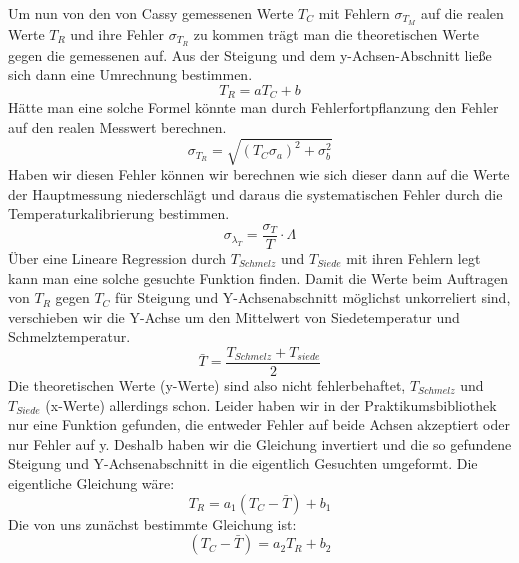 \documentclass[12pt,a4paper]{article}
\begin{document}
Um nun von den von Cassy gemessenen Werte $T_C$ mit Fehlern $\sigma_{T_M}$ auf die realen Werte $T_R$ und ihre Fehler $\sigma_{T_{R}}$ zu kommen trägt man die theoretischen Werte gegen die gemessenen auf. Aus der Steigung und dem y-Achsen-Abschnitt ließe sich dann eine Umrechnung bestimmen.
\begin{equation}
T_{R}=aT_{C}+b
\end{equation}
Hätte man eine solche Formel könnte man durch Fehlerfortpflanzung den Fehler auf den realen  Messwert berechnen. 
\begin{equation}
\sigma_{T_{R}} = \sqrt{(T_C \sigma_a)^2+\sigma_b^2}
\end{equation}
Haben wir diesen Fehler können wir berechnen wie sich dieser dann auf die Werte der Hauptmessung niederschlägt und daraus die systematischen Fehler durch die Temperaturkalibrierung bestimmen. 
\begin{equation}
\sigma_{\lambda_{T}}=\frac{\sigma_T}{T}\cdot \Lambda
\end{equation}
Über eine Lineare Regression durch $T_{Schmelz}$ und $T_{Siede}$ mit ihren Fehlern legt kann man eine solche gesuchte Funktion finden. 
Damit die Werte beim Auftragen von $T_R$ gegen $T_C$ für Steigung und Y-Achsenabschnitt möglichst unkorreliert sind, verschieben wir die Y-Achse um den Mittelwert von Siedetemperatur und Schmelztemperatur.
\begin{equation}
\bar{T}=\frac{T_{Schmelz}+T_{siede}}{2}
\end{equation}
Die theoretischen Werte (y-Werte) sind also nicht fehlerbehaftet, $T_{Schmelz}$ und $T_{Siede}$ (x-Werte) allerdings schon. Leider haben wir in der Praktikumsbibliothek nur eine Funktion gefunden, die entweder Fehler auf beide Achsen akzeptiert oder nur Fehler auf y. \newline 
Deshalb haben wir die Gleichung invertiert und die so gefundene Steigung und Y-Achsenabschnitt in die eigentlich Gesuchten umgeformt.
Die eigentliche Gleichung wäre:
\begin{equation}
T_{R}=a_1(T_{C}-\bar{T})+b_1
\end{equation}
Die von uns zunächst bestimmte Gleichung ist:
\begin{equation}
(T_{C}-\bar{T})=a_2T_R+b_2
\end{equation}
\end{document}
